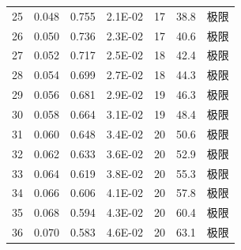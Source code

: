 {\begin{longtable}{ccccccc}
25&0.048&0.755&2.1E-02&17&38.8&极限\\
26&0.050&0.736&2.3E-02&17&40.6&极限\\
27&0.052&0.717&2.5E-02&18&42.4&极限\\
28&0.054&0.699&2.7E-02&18&44.3&极限\\
29&0.056&0.681&2.9E-02&19&46.3&极限\\
30&0.058&0.664&3.1E-02&19&48.4&极限\\
31&0.060&0.648&3.4E-02&20&50.6&极限\\
32&0.062&0.633&3.6E-02&20&52.9&极限\\
33&0.064&0.619&3.8E-02&20&55.3&极限\\
34&0.066&0.606&4.1E-02&20&57.8&极限\\
35&0.068&0.594&4.3E-02&20&60.4&极限\\
36&0.070&0.583&4.6E-02&20&63.1&极限\\
\end{longtable}
}
